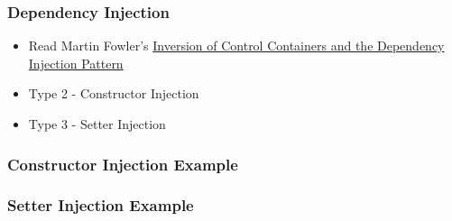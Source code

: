 \subsubsection{Dependency Injection}\label{dependency-injection-1}

\begin{itemize}
\itemsep1pt\parskip0pt
\item
  Read Martin Fowler's
  \href{http://www.martinfowler.com/articles/injection.html}{Inversion
  of Control Containers and the Dependency Injection Pattern}
\item
  Type 2 - Constructor Injection
\item
  Type 3 - Setter Injection
\end{itemize}

\subsubsection{Constructor Injection
Example}\label{constructor-injection-example}

\begin{Shaded}
\begin{Highlighting}[]

 
\NormalTok{\};}

 
\NormalTok{:}
  \NormalTok{\{}
  \NormalTok{\}}

\NormalTok{:}
\NormalTok{\};}

 
\NormalTok{\{}
\NormalTok{\}}

\end{Highlighting}
\end{Shaded}

\subsubsection{Setter Injection Example}\label{setter-injection-example}

\begin{Shaded}
\begin{Highlighting}[]

 
\NormalTok{\};}

 
\NormalTok{:}
  \NormalTok{\{}
  \NormalTok{\}}
   

\NormalTok{:}
\NormalTok{\};}

 
\NormalTok{\{}
\NormalTok{\}}

\end{Highlighting}
\end{Shaded}

